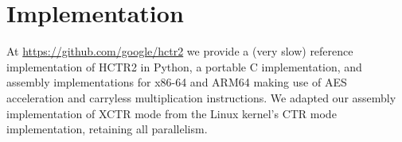 \documentclass[hctr2.tex]{subfiles}
\begin{document}
\section{Implementation}\label{implementation}
At \url{https://github.com/google/hctr2}
we provide a (very slow) reference implementation of HCTR2 in Python,
a portable C implementation,
and assembly implementations for x86-64 and ARM64
making use of AES acceleration and carryless multiplication instructions.
We adapted our assembly implementation of XCTR mode from
the Linux kernel's CTR mode implementation, retaining all parallelism.
\end{document}
